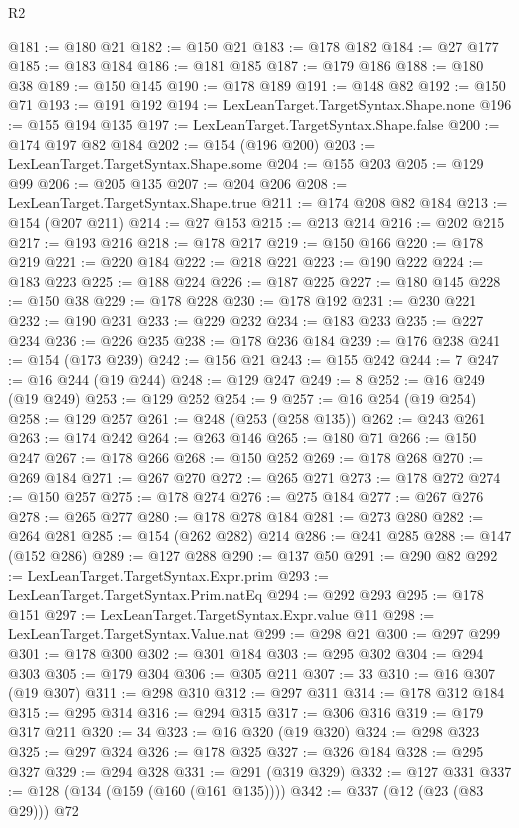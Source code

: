 \begin{lexlean}{R2}
\begin{coremodule}
@181 := @180 @21
@182 := @150 @21
@183 := @178 @182
@184 := @27 @177
@185 := @183 @184
@186 := @181 @185
@187 := @179 @186
@188 := @180 @38
@189 := @150 @145
@190 := @178 @189
@191 := @148 @82
@192 := @150 @71
@193 := @191 @192
@194 := LexLeanTarget.TargetSyntax.Shape.none
@196 := @155 @194 @135
@197 := LexLeanTarget.TargetSyntax.Shape.false
@200 := @174 @197 @82 @184
@202 := @154 (@196 @200)
@203 := LexLeanTarget.TargetSyntax.Shape.some
@204 := @155 @203
@205 := @129 @99
@206 := @205 @135
@207 := @204 @206
@208 := LexLeanTarget.TargetSyntax.Shape.true
@211 := @174 @208 @82 @184
@213 := @154 (@207 @211)
@214 := @27 @153
@215 := @213 @214
@216 := @202 @215
@217 := @193 @216
@218 := @178 @217
@219 := @150 @166
@220 := @178 @219
@221 := @220 @184
@222 := @218 @221
@223 := @190 @222
@224 := @183 @223
@225 := @188 @224
@226 := @187 @225
@227 := @180 @145
@228 := @150 @38
@229 := @178 @228
@230 := @178 @192
@231 := @230 @221
@232 := @190 @231
@233 := @229 @232
@234 := @183 @233
@235 := @227 @234
@236 := @226 @235
@238 := @178 @236 @184
@239 := @176 @238
@241 := @154 (@173 @239)
@242 := @156 @21
@243 := @155 @242
@244 := 7
@247 := @16 @244 (@19 @244)
@248 := @129 @247
@249 := 8
@252 := @16 @249 (@19 @249)
@253 := @129 @252
@254 := 9
@257 := @16 @254 (@19 @254)
@258 := @129 @257
@261 := @248 (@253 (@258 @135))
@262 := @243 @261
@263 := @174 @242
@264 := @263 @146
@265 := @180 @71
@266 := @150 @247
@267 := @178 @266
@268 := @150 @252
@269 := @178 @268
@270 := @269 @184
@271 := @267 @270
@272 := @265 @271
@273 := @178 @272
@274 := @150 @257
@275 := @178 @274
@276 := @275 @184
@277 := @267 @276
@278 := @265 @277
@280 := @178 @278 @184
@281 := @273 @280
@282 := @264 @281
@285 := @154 (@262 @282) @214
@286 := @241 @285
@288 := @147 (@152 @286)
@289 := @127 @288
@290 := @137 @50
@291 := @290 @82
@292 := LexLeanTarget.TargetSyntax.Expr.prim
@293 := LexLeanTarget.TargetSyntax.Prim.natEq
@294 := @292 @293
@295 := @178 @151
@297 := LexLeanTarget.TargetSyntax.Expr.value @11
@298 := LexLeanTarget.TargetSyntax.Value.nat
@299 := @298 @21
@300 := @297 @299
@301 := @178 @300
@302 := @301 @184
@303 := @295 @302
@304 := @294 @303
@305 := @179 @304
@306 := @305 @211
@307 := 33
@310 := @16 @307 (@19 @307)
@311 := @298 @310
@312 := @297 @311
@314 := @178 @312 @184
@315 := @295 @314
@316 := @294 @315
@317 := @306 @316
@319 := @179 @317 @211
@320 := 34
@323 := @16 @320 (@19 @320)
@324 := @298 @323
@325 := @297 @324
@326 := @178 @325
@327 := @326 @184
@328 := @295 @327
@329 := @294 @328
@331 := @291 (@319 @329)
@332 := @127 @331
@337 := @128 (@134 (@159 (@160 (@161 @135))))
@342 := @337 (@12 (@23 (@83 @29))) @72

\end{coremodule}
\end{lexlean}

